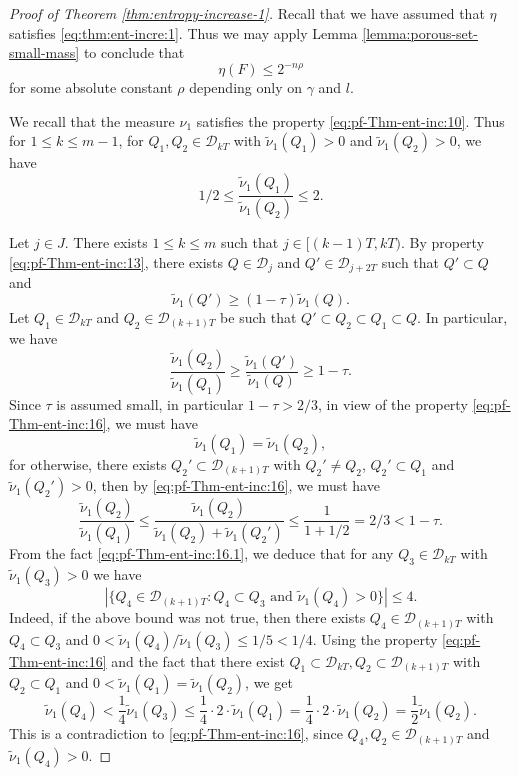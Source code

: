 \documentclass[a4paper,11pt]{amsart}
\theoremstyle{definition}
\numberwithin{equation}{section}
\def\D{\mathcal{D}}
\begin{document}
\begin{proof}[Proof of Theorem \ref{thm:entropy-increase-1}]
{Recall that we have assumed that $\eta$ satisfies \eqref{eq:thm:ent-incre:1}.  Thus we may apply Lemma \ref{lemma:porous-set-small-mass} to conclude that 
\begin{equation}\label{eq:pf-Thm-ent-inc:19}
\eta(F)\le 2^{-n\rho}
\end{equation}
for some absolute constant $\rho$ depending only on $\gamma$ and $l$.  

\iffalse
{\color{red}We recall that the measure $\nu_1$ satisfies the property \eqref{eq:pf-Thm-ent-inc:10}.  Thus for $1\le k\le m-1$,  for $Q_1,Q_2\in \D_{kT}$ with $\tilde{\nu}_1(Q_1)>0$ and $\tilde{\nu}_1(Q_2)>0$, we have
 \begin{equation}\label{eq:pf-Thm-ent-inc:16...}
1/2\le \frac{\tilde{\nu}_1(Q_1)}{\tilde{\nu}_1(Q_2)} \le 2.
\end{equation}

Let $j\in J$. There exists $1\le k\le m$ such that $j\in [(k-1)T,kT)$.  By property \eqref{eq:pf-Thm-ent-inc:13}, there exists $Q\in \D_j$ and $Q'\in \D_{j+2T}$ such that  $Q'\subset Q$ and 
\[
\tilde{\nu}_1(Q')\ge (1-\tau)\tilde{\nu}_1(Q).
\]
Let $Q_1\in \D_{kT}$ and $Q_2\in \D_{(k+1)T}$ be such that $Q'\subset Q_2\subset Q_1\subset Q$.
In particular,  we have
\[
\frac{\tilde{\nu}_1(Q_2)}{\tilde{\nu}_1(Q_1)} \ge \frac{\tilde{\nu}_1(Q')}{\tilde{\nu}_1(Q)}\ge 1-\tau.
\]
 Since $\tau$ is assumed small, in particular $1-\tau>2/3$,  in view of the property \eqref{eq:pf-Thm-ent-inc:16},  we must have
 \begin{equation}\label{eq:pf-Thm-ent-inc:16.1...}
\tilde{\nu}_1(Q_1)=\tilde{\nu}_1(Q_2),
 \end{equation}
 for otherwise,  there exists $Q_2'\subset \D_{(k+1)T}$ with $Q_2'\neq Q_2$,  $Q_2'\subset Q_1$ and $\tilde{\nu}_1(Q_2')>0$,  then by \eqref{eq:pf-Thm-ent-inc:16}, we must have $$\frac{\tilde{\nu}_1(Q_2)}{\tilde{\nu}_1(Q_1)} \le \frac{\tilde{\nu}_1(Q_2)}{\tilde{\nu}_1(Q_2)+\tilde{\nu}_1(Q_2')}\le  \frac{1}{1+1/2}=2/3<1-\tau.$$
 From the fact \eqref{eq:pf-Thm-ent-inc:16.1},   we deduce that for any $Q_3\in \D_{kT}$ with $\tilde{\nu}_1(Q_3)>0$ we have
 \begin{equation}\label{eq:pf-Thm-ent-inc:17...}
\left| \{ Q_4\in \D_{(k+1)T}:Q_4\subset Q_3 \textrm{ and } \tilde{\nu}_1(Q_4)>0 \} \right| \le 4.
\end{equation}
Indeed, if the above bound was not true, then there exists $Q_4\in \D_{(k+1)T}$ with $Q_4\subset Q_3$ and $0<\tilde{\nu}_1(Q_4)/\tilde{\nu}_1(Q_3)\le 1/5<1/4.$ 
Using the property \eqref{eq:pf-Thm-ent-inc:16} and the fact that there exist $Q_1\subset \D_{kT},  Q_2\subset \D_{(k+1)T}$  with $Q_2\subset Q_1$ and $0<\tilde{\nu}_1(Q_1)=\tilde{\nu}_1(Q_2)$,  we get
\[
\tilde{\nu}_1(Q_4)<\frac{1}{4}\tilde{\nu}_1(Q_3)\le \frac{1}{4}\cdot 2\cdot \tilde{\nu}_1(Q_1)=\frac{1}{4}\cdot 2\cdot \tilde{\nu}_1(Q_2)=\frac{1}{2}\tilde{\nu}_1(Q_2).
\]
This is a contradiction to \eqref{eq:pf-Thm-ent-inc:16},  since $Q_4,Q_2\in\D_{(k+1)T}$ and $\tilde{\nu}_1(Q_4)>0$.


}}
\end{proof}
\end{document}
